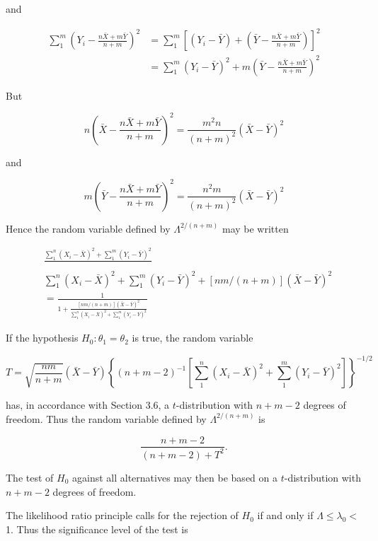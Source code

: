 and

$$
\begin{aligned}
\sum_{1}^{m}\left(Y_{i}-\frac{n \bar{X}+m \bar{Y}}{n+m}\right)^{2} & =\sum_{1}^{m}\left[\left(Y_{i}-\bar{Y}\right)+\left(\bar{Y}-\frac{n \bar{X}+m \bar{Y}}{n+m}\right)\right]^{2} \\
& =\sum_{1}^{m}\left(Y_{i}-\bar{Y}\right)^{2}+m\left(\bar{Y}-\frac{n \bar{X}+m \bar{Y}}{n+m}\right)^{2}
\end{aligned}
$$

But

$$
n\left(\bar{X}-\frac{n \bar{X}+m \bar{Y}}{n+m}\right)^{2}=\frac{m^{2} n}{(n+m)^{2}}(\bar{X}-\bar{Y})^{2}
$$

and

$$
m\left(\bar{Y}-\frac{n \bar{X}+m \bar{Y}}{n+m}\right)^{2}=\frac{n^{2} m}{(n+m)^{2}}(\bar{X}-\bar{Y})^{2}
$$

Hence the random variable defined by $\Lambda^{2 /(n+m)}$ may be written

$$
\begin{aligned}
& \frac{\sum_{1}^{n}\left(X_{i}-\bar{X}\right)^{2}+\sum_{1}^{m}\left(Y_{i}-\bar{Y}\right)^{2}}{} \\
& \sum_{1}^{n}\left(X_{i}-\bar{X}\right)^{2}+\sum_{1}^{m}\left(Y_{i}-\bar{Y}\right)^{2}+[n m /(n+m)](\bar{X}-\bar{Y})^{2} \\
&=\frac{1}{1+\frac{[n m /(n+m)](\bar{X}-\bar{Y})^{2}}{\sum_{1}^{n}\left(X_{i}-\bar{X}\right)^{2}+\sum_{1}^{m}\left(Y_{i}-\bar{Y}\right)^{2}}}
\end{aligned}
$$

If the hypothesis $H_{0}: \theta_{1}=\theta_{2}$ is true, the random variable


\begin{equation*}
T=\sqrt{\frac{n m}{n+m}}(\bar{X}-\bar{Y})\left\{(n+m-2)^{-1}\left[\sum_{1}^{n}\left(X_{i}-\bar{X}\right)^{2}+\sum_{1}^{m}\left(Y_{i}-\bar{Y}\right)^{2}\right]\right\}^{-1 / 2} \tag{8.3.4}
\end{equation*}


has, in accordance with Section 3.6, a $t$-distribution with $n+m-2$ degrees of freedom. Thus the random variable defined by $\Lambda^{2 /(n+m)}$ is

$$
\frac{n+m-2}{(n+m-2)+T^{2}} .
$$

The test of $H_{0}$ against all alternatives may then be based on a $t$-distribution with $n+m-2$ degrees of freedom.

The likelihood ratio principle calls for the rejection of $H_{0}$ if and only if $\Lambda \leq \lambda_{0}<$ 1. Thus the significance level of the test is

